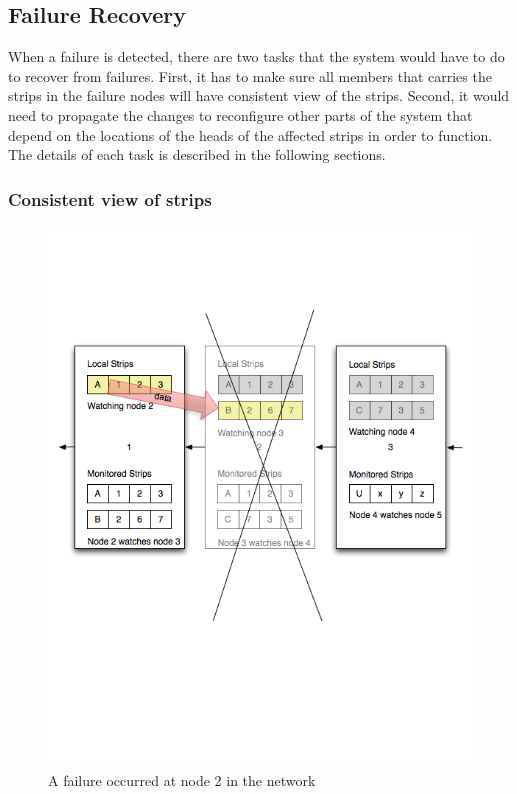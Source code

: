 \subsection{Failure Recovery}
\label{s:fr}

When a failure is detected, there are two tasks that the system would have to do
to recover from failures. First, it has to make sure all members that carries
the strips in the failure nodes will have consistent view of the strips.
Second, it would need to propagate the changes to reconfigure other parts of
the system that depend on the locations of the heads of the affected strips in
order to function. The details of each task is described in the following
sections.

\subsubsection{Consistent view of strips}

\begin{figure}[h!]
\centering
    \includegraphics[width=\linewidth]{figures/strip3}
\caption{A failure occurred at node 2 in the network}
\label{fig:strip3}
\end{figure}

